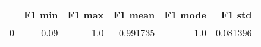 \begin{tabular}{lrrrrr}
\toprule
{} &  F1 min &  F1 max &   F1 mean &  F1 mode &    F1 std \\
\midrule
0 &    0.09 &     1.0 &  0.991735 &      1.0 &  0.081396 \\
\bottomrule
\end{tabular}
